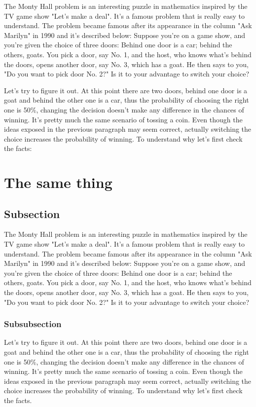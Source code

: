 \documentclass{oscmjournal}
\begin{document}
The Monty Hall problem is an interesting puzzle in mathematics inspired by the TV  game show "Let's make a deal". It's a famous problem that is really easy to understand. The problem became famous after its appearance in the column "Ask Marilyn" in 1990 and  it's described below: Suppose you're on a game show, and you're given the choice of three doors: Behind one  door is a car; behind the others, goats. You pick a door, say No. 1, and the host, who  knows what's behind the doors, opens another door, say No. 3, which has a goat. He then  says to you, "Do you want to pick door No. 2?" Is it to your advantage to switch your choice?


Let's try to figure it out. At this point there are two doors, behind one door is a goat  and behind the other one is a car, thus the probability of choosing the right one is 50\%, changing the decision doesn't make any difference in the chances of winning. It's pretty much the same scenario of tossing a coin. Even though the ideas exposed in the previous paragraph may seem correct, actually switching the choice increases the probability of winning. To understand why let's  first check the facts:

\section{The same thing}

\subsection{Subsection}

The Monty Hall problem is an interesting puzzle in mathematics inspired by the TV  game show "Let's make a deal". It's a famous problem that is really easy to understand. The problem became famous after its appearance in the column "Ask Marilyn" in 1990 and  it's described below: Suppose you're on a game show, and you're given the choice of three doors: Behind one  door is a car; behind the others, goats. You pick a door, say No. 1, and the host, who  knows what's behind the doors, opens another door, say No. 3, which has a goat. He then  says to you, "Do you want to pick door No. 2?" Is it to your advantage to switch your choice?
\subsubsection{Subsubsection}

Let's try to figure it out. At this point there are two doors, behind one door is a goat  and behind the other one is a car, thus the probability of choosing the right one is 50\%, changing the decision doesn't make any difference in the chances of winning. It's pretty much the same scenario of tossing a coin. Even though the ideas exposed in the previous paragraph may seem correct, actually switching the choice increases the probability of winning. To understand why let's  first check the facts.
\end{document}

